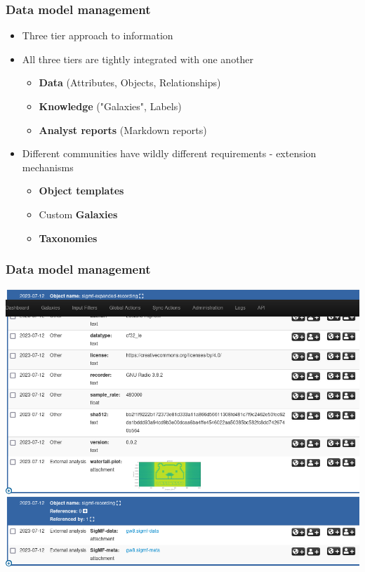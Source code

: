 \begin{frame}
\frametitle{Data model management}
    \begin{itemize}
        \item Three tier approach to information
        \item All three tiers are tightly integrated with one another
        \begin{itemize}
            \item {\bf Data} (Attributes, Objects, Relationships)
            \item {\bf Knowledge} ("Galaxies", Labels)
            \item {\bf Analyst reports} (Markdown reports)
        \end{itemize}
        \item Different communities have wildly different requirements - extension mechanisms
        \begin{itemize}
            \item {\bf Object templates}
            \item Custom {\bf Galaxies}
            \item {\bf Taxonomies}
        \end{itemize}
    \end{itemize}
\end{frame}

\begin{frame}
    \frametitle{Data model management}
    \includegraphics[width=0.90\linewidth]{sigint.png}
\end{frame}


